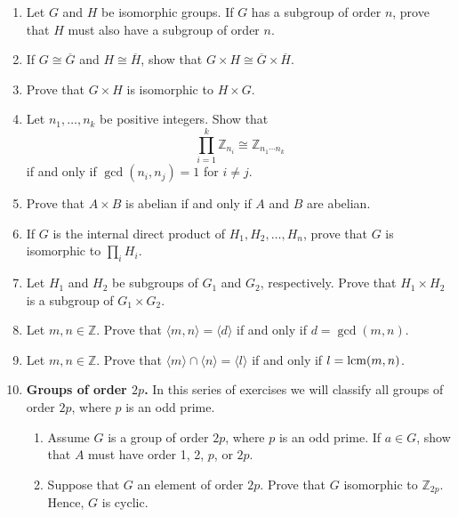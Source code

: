 {\begin{enumerate}
\item
Let $G$ and $H$ be isomorphic groups. If $G$ has a subgroup of order
$n$, prove that $H$ must also have a subgroup of  order $n$.
 

\item
If $G \cong \overline{G}$ and $H \cong \overline{H}$, show that $G
\times H \cong \overline{G} \times \overline{H}$.
 

\item
Prove that $G \times H$ is isomorphic to $H \times G$.
 

\item
Let $n_1, \ldots, n_k$ be positive integers. Show that
\[
\prod_{i=1}^k {\mathbb Z}_{n_i} \cong {\mathbb Z}_{n_1 \cdots n_k}
\]
if and only if $\gcd( n_i, n_j) =1$ for $i \neq j$.
 

\item
Prove that $A \times B$ is abelian if and only if $A$ and $B$ are
abelian. 
 

\item
If $G$ is the internal direct product of $H_1, H_2, \ldots, H_n$,
prove that $G$ is isomorphic to $\prod_i H_i$. 
 

\item
Let $H_1$ and $H_2$ be subgroups of $G_1$ and $G_2$, respectively. Prove that $H_1 \times H_2$ is a subgroup of $G_1 \times G_2$. 
 

\item %
Let $m, n \in {\mathbb Z}$. Prove that $\langle m,n \rangle = \langle d \rangle$ if and only if $d = \gcd(m,n)$.
 

\item  %
Let $m, n \in {\mathbb Z}$. Prove that $\langle m \rangle \cap \langle n \rangle = \langle l \rangle$ if and only if $l = \operatorname{lcm}(m,n)$. 

\item %
{\bf Groups of order $2p$.}
In this series of exercises we will classify all groups of order $2p$, where $p$ is an odd prime.
\begin{enumerate}

\item
Assume $G$ is a group of order $2p$, where $p$ is an odd prime.  If $a \in G$, show that $A$ must have order 1, 2, $p$, or $2p$.


\item
Suppose that $G$ an element of order $2p$.  Prove that $G$ isomorphic to ${\mathbb Z}_{2p}$.  Hence, $G$ is cyclic.




\end{enumerate}
\end{enumerate}}
